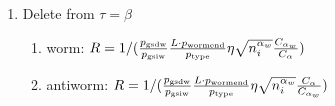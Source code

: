 \documentclass[12pt, two sided]{article}
\begin{document}
\begin{enumerate}
\begin{enumerate}
		\end{enumerate}
		\item Delete from $\tau=\beta$ 
		\begin{enumerate}
		\item{worm: $R =  1/(\frac{p_{\rm{gsdw}}}{p_{\rm{gsiw}}} \frac{L \cdot p_{\rm{wormend}}}{p_{\rm{type}}} \eta \sqrt{n_i^{\alpha_w}} \frac{C_{\alpha_w}}{C_{\alpha}})$}
		\item{antiworm: $R =  1/(\frac{p_{\rm{gsdw}}}{p_{\rm{gsiw}}} \frac{L \cdot p_{\rm{wormend}}}{p_{\rm{type}}} \eta \sqrt{n_i^{\alpha_w}} \frac{C_{\alpha}}{C_{\alpha_w}})$}
		\end{enumerate}
	\end{enumerate}

{} 
 \singlespacing


\doublespacing
\end{document}
